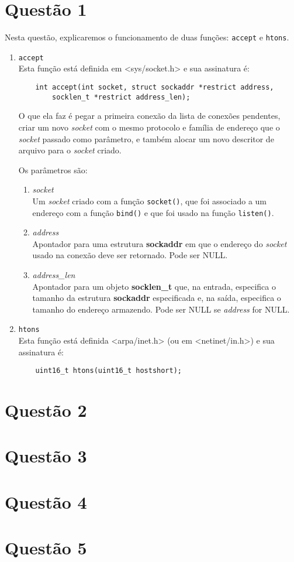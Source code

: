 \documentclass[a4paper,10pt]{article}
\begin{document}
\section{Questão 1}
Nesta questão, explicaremos o funcionamento de duas funções: {\tt accept} e {\tt htons}.
\begin{enumerate}
\item {\tt accept}\\
    Esta função está definida em <sys/socket.h> e sua assinatura é:
    \begin{lstlisting}
    int accept(int socket, struct sockaddr *restrict address,
        socklen_t *restrict address_len);
    \end{lstlisting}
    O que ela faz é pegar a primeira conexão da lista de conexões pendentes, criar um novo \textit{socket} com o mesmo protocolo e família de endereço que o \textit{socket} passado como parâmetro, e também alocar um novo descritor de arquivo para o \textit{socket} criado.
    
    Os parâmetros são:
    \begin{enumerate}
        \item \textit{socket}\\
        Um \textit{socket} criado com a função {\tt socket()}, que foi associado a um endereço com a função {\tt bind()} e que foi usado na função {\tt listen()}.
        \item \textit{address}\\
        Apontador para uma estrutura \textbf{sockaddr} em que o endereço do \textit{socket} usado na conexão deve ser retornado. Pode ser NULL.
        \item \textit{address\_len}\\
        Apontador para um objeto \textbf{socklen\_t} que, na entrada, especifica o tamanho da estrutura \textbf{sockaddr} especificada e, na saída, especifica o tamanho do endereço armazendo. Pode ser NULL se \textit{address} for NULL.
    \end{enumerate}
\item {\tt htons}\\
    Esta função está definida <arpa/inet.h> (ou em <netinet/in.h>) e sua assinatura é:
    \begin{lstlisting}
    uint16_t htons(uint16_t hostshort);
    \end{lstlisting}
\end{enumerate}

\section{Questão 2}

\section{Questão 3}

\section{Questão 4}

\section{Questão 5}
\end{document}
